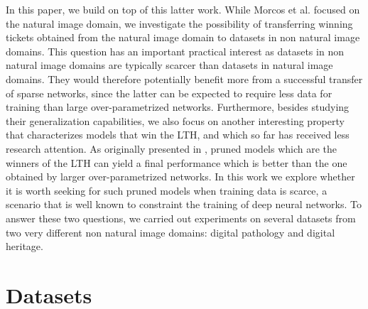 In this paper, we build on top of this latter work. While Morcos et al. \cite{morcos2019one} focused on the natural image domain, we investigate the possibility of transferring winning tickets obtained from the natural image domain to datasets in non natural image domains. This question has an important practical interest as datasets in non natural image domains are typically scarcer than datasets in natural image domains. They would therefore potentially benefit more from a successful transfer of sparse networks, since the latter can be expected to require less data for training than large over-parametrized networks. Furthermore, besides studying their generalization capabilities, we also focus on another interesting property that characterizes models that win the LTH, and which so far has received less research attention. As originally presented in \cite{frankle2018lottery}, pruned models which are the winners of the LTH can yield a final performance which is better than the one obtained by larger over-parametrized networks. In this work we explore whether it is worth seeking for such pruned models when training data is scarce, a scenario that is well known to constraint the training of deep neural networks. To answer these two questions, we carried out experiments on several datasets from two very different non natural image domains: digital pathology and digital heritage.

\section{Datasets}
\label{sec:datasets}

